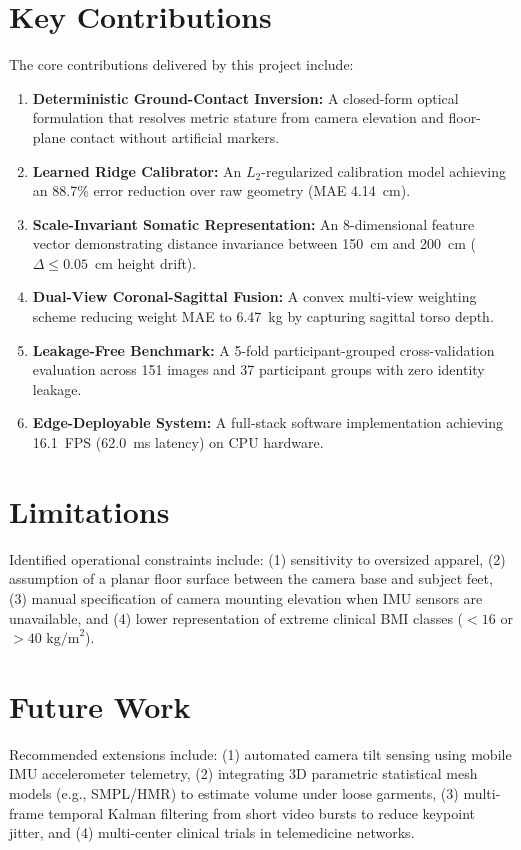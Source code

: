 \documentclass[12pt,a4paper,oneside]{report}
\begin{document}
\section{Key Contributions}
The core contributions delivered by this project include:
\begin{enumerate}[label=\arabic*.]
    \item \textbf{Deterministic Ground-Contact Inversion:} A closed-form optical formulation that resolves metric stature from camera elevation and floor-plane contact without artificial markers.
    \item \textbf{Learned Ridge Calibrator:} An $L_2$-regularized calibration model achieving an 88.7\% error reduction over raw geometry (MAE 4.14~cm).
    \item \textbf{Scale-Invariant Somatic Representation:} An 8-dimensional feature vector demonstrating distance invariance between 150~cm and 200~cm ($\Delta \le 0.05$~cm height drift).
    \item \textbf{Dual-View Coronal-Sagittal Fusion:} A convex multi-view weighting scheme reducing weight MAE to 6.47~kg by capturing sagittal torso depth.
    \item \textbf{Leakage-Free Benchmark:} A 5-fold participant-grouped cross-validation evaluation across 151 images and 37 participant groups with zero identity leakage.
    \item \textbf{Edge-Deployable System:} A full-stack software implementation achieving 16.1~FPS (62.0~ms latency) on CPU hardware.
\end{enumerate}

\section{Limitations}
Identified operational constraints include: (1) sensitivity to oversized apparel, (2) assumption of a planar floor surface between the camera base and subject feet, (3) manual specification of camera mounting elevation when IMU sensors are unavailable, and (4) lower representation of extreme clinical BMI classes ($<16$ or $>40\text{ kg/m}^2$).

\section{Future Work}
Recommended extensions include: (1) automated camera tilt sensing using mobile IMU accelerometer telemetry, (2) integrating 3D parametric statistical mesh models (e.g., SMPL/HMR) to estimate volume under loose garments, (3) multi-frame temporal Kalman filtering from short video bursts to reduce keypoint jitter, and (4) multi-center clinical trials in telemedicine networks.
\end{document}
